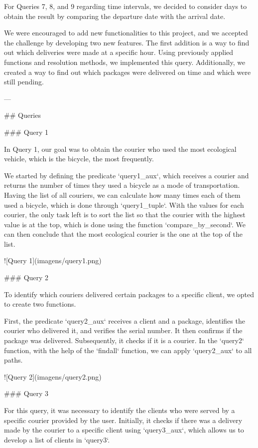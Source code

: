 For Queries 7, 8, and 9 regarding time intervals, we decided to consider days to obtain the result by comparing the departure date with the arrival date.

We were encouraged to add new functionalities to this project, and we accepted the challenge by developing two new features. The first addition is a way to find out which deliveries were made at a specific hour. Using previously applied functions and resolution methods, we implemented this query. Additionally, we created a way to find out which packages were delivered on time and which were still pending.

---

## Queries

### Query 1

In Query 1, our goal was to obtain the courier who used the most ecological vehicle, which is the bicycle, the most frequently.

We started by defining the predicate `query1_aux`, which receives a courier and returns the number of times they used a bicycle as a mode of transportation. Having the list of all couriers, we can calculate how many times each of them used a bicycle, which is done through `query1_tuple`. With the values for each courier, the only task left is to sort the list so that the courier with the highest value is at the top, which is done using the function `compare_by_second`. We can then conclude that the most ecological courier is the one at the top of the list.

![Query 1](imagens/query1.png)

### Query 2

To identify which couriers delivered certain packages to a specific client, we opted to create two functions.

First, the predicate `query2_aux` receives a client and a package, identifies the courier who delivered it, and verifies the serial number. It then confirms if the package was delivered. Subsequently, it checks if it is a courier. In the `query2` function, with the help of the `findall` function, we can apply `query2_aux` to all paths.

![Query 2](imagens/query2.png)

### Query 3

For this query, it was necessary to identify the clients who were served by a specific courier provided by the user. Initially, it checks if there was a delivery made by the courier to a specific client using `query3_aux`, which allows us to develop a list of clients in `query3`.

